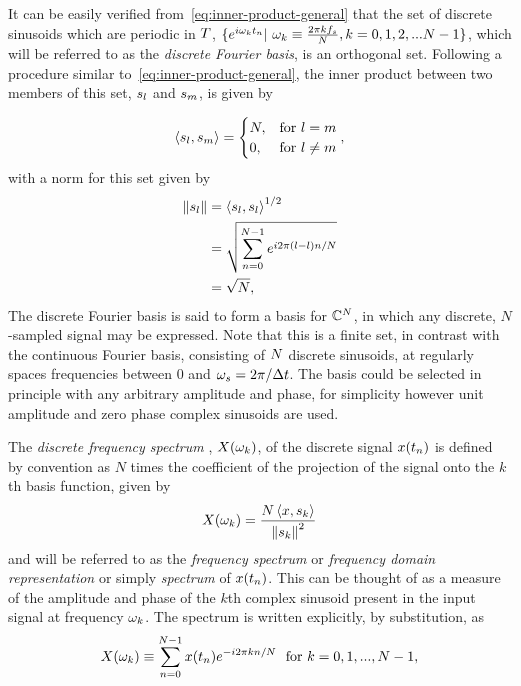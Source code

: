 It can be easily verified from~\eqref{eq:inner-product-general} that the set of discrete sinusoids which are periodic in $T$, $\{ e^{i \omega_{k} t_n} |\ \omega_{k} \equiv \frac{2 \pi k  f_s}{N},  k = 0,1,2,...N-1 \}$, which will be referred to as the \textit{discrete Fourier basis}, is an orthogonal set. Following a procedure similar to~\eqref{eq:inner-product-general}, the inner product between two members of this set, $s_l$ and $s_m$, is given by

$$
\left< s_l, s_m \right> =
    \begin{cases}
      N, & \text{for}\ l = m \\
      0, & \text{for}\ l \ne m
    \end{cases}
    ,
$$
with a norm for this set given by
\begin{align*}
  \left\lVert s_l\right\rVert
  &= \left< s_l, s_l\right>^{1/2} \\
  &= \sqrt{ \sum_{n=0}^{N-1} e^{i 2 \pi(l-l) n / N} }
\\ &= \sqrt{N}
,
\end{align*}
The discrete Fourier basis is said to form a basis for $\mathbb{C}^{N}$, in which any discrete, $N$-sampled signal may be expressed. Note that this is a finite set, in contrast with the continuous Fourier basis, consisting of $N$ discrete sinusoids, at regularly spaces frequencies between $0$ and $\omega_s = 2 \pi / \Delta t$. The basis could be selected in principle with any arbitrary amplitude and phase, for simplicity however unit amplitude and zero phase complex sinusoids are used.

The \textit{ discrete frequency spectrum }, $X(\omega_{k})$, of the discrete signal $x(t_n)$ is defined by convention as $N$ times the coefficient of the projection of the signal onto the $k$th basis function, given by
$$
X(\omega_{k}) = \frac { N \left< x, s_k \right> }{\left\lVert s_k\right\rVert^2}
$$
and will be referred to as the \textit{ frequency spectrum } or \textit{frequency domain representation} or simply \textit{spectrum} of $x(t_n)$. This can be thought of as a measure of the amplitude and phase of the $k$th complex sinusoid present in the input signal at frequency $\omega_{k}$. The spectrum is written explicitly, by substitution, as
\begin{equation}
  X(\omega_{k})
  \equiv \sum_{n=0}^{N-1} x(t_n) e^{-i 2 \pi k n / N }\ \ \textrm{for}\ k = 0,1,...,N - 1
  \label{eq:dft}
  ,
\end{equation}

